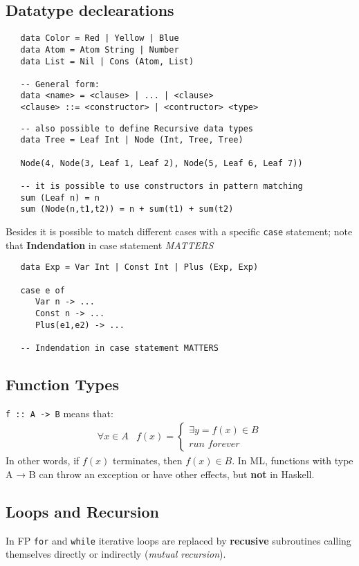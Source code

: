 \subsection*{Datatype declearations}
\begin{lstlisting}
   data Color = Red | Yellow | Blue
   data Atom = Atom String | Number
   data List = Nil | Cons (Atom, List)

   -- General form:
   data <name> = <clause> | ... | <clause>
   <clause> ::= <constructor> | <contructor> <type>
\end{lstlisting}

\begin{lstlisting}
   -- also possible to define Recursive data types
   data Tree = Leaf Int | Node (Int, Tree, Tree)

   Node(4, Node(3, Leaf 1, Leaf 2), Node(5, Leaf 6, Leaf 7))

   -- it is possible to use constructors in pattern matching
   sum (Leaf n) = n
   sum (Node(n,t1,t2)) = n + sum(t1) + sum(t2)
\end{lstlisting}

Besides it is possible to match different cases with a specific \texttt{case} statement;
note that \textbf{Indendation} in case statement \textit{MATTERS}
\begin{lstlisting}
   data Exp = Var Int | Const Int | Plus (Exp, Exp)

   case e of
      Var n -> ...
      Const n -> ...
      Plus(e1,e2) -> ...

   -- Indendation in case statement MATTERS
\end{lstlisting}

\subsection{Function Types}
\lstinline{f :: A -> B} means that:
 \begin{align*}
   \forall x \in A & f(x) =
   \begin{cases}
      \exists y = f(x) \in B \\
      \textit{run forever}
   \end{cases}
\end{align*}
In other words, if $f(x)$ terminates, then $f(x) \in B$.
In ML, functions with type A → B can throw an exception or
have other effects, but \textbf{not} in Haskell.

\subsection{Loops and Recursion}
In FP \texttt{for} and \texttt{while} iterative loops are replaced by \textbf{recusive} subroutines calling themselves directly or indirectly (\textit{mutual recursion}).

